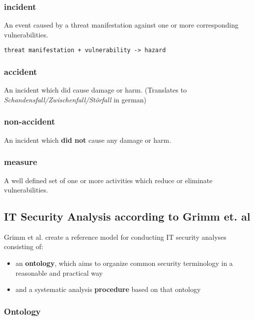 \subsubsection{incident}

An event caused by a threat manifestation against one or more
corresponding vulnerabilities.

\texttt{threat manifestation + vulnerability -\textgreater{} hazard}

\subsubsection{accident}

An incident which did cause damage or harm. (Translates to
\emph{Schandensfall/Zwischenfall/Störfall} in german)

\subsubsection{non-accident}

An incident which \textbf{did not} cause any damage or harm.

\subsubsection{measure}

A well defined set of one or more activities which reduce or eliminate
vulnerabilities.

\subsection{IT Security Analysis according to Grimm et. al}

Grimm et al. create a reference model for conducting IT security
analyses consisting of:

\begin{itemize}
\itemsep1pt\parskip0pt
\item
  an \textbf{ontology}, which aims to organize common security
  terminology in a reasonable and practical way
\item
  and a systematic analysis \textbf{procedure} based on that ontology
\end{itemize}

\subsubsection{Ontology}

